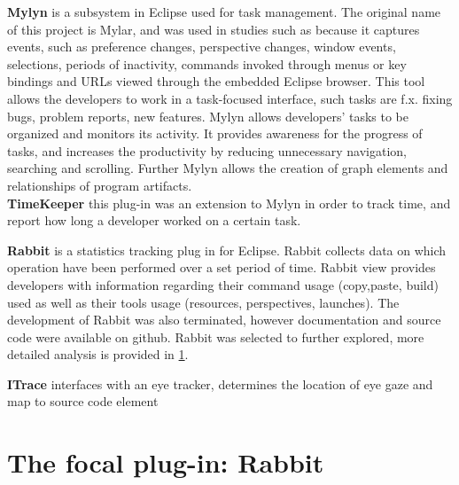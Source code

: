 \textbf{Mylyn} is a subsystem in Eclipse used for task management. The original name of this project is Mylar, and was used in studies such as 
because it captures events, such as preference changes, 
perspective changes, window events, selections, periods of inactivity, commands invoked through menus or key bindings and URLs viewed through the embedded Eclipse browser.
This tool allows the developers to work in a task-focused interface, such tasks are f.x. fixing bugs, problem reports, new features.
Mylyn allows developers' tasks to be organized and monitors its activity. It provides awareness for the progress of tasks, and increases the productivity by reducing unnecessary navigation, searching and scrolling.
Further Mylyn allows the creation of graph elements and relationships of program artifacts.\\
\textbf{TimeKeeper} this plug-in was an extension to Mylyn in order to track time, and report how long a developer worked on a certain task.

\textbf{Rabbit} is a statistics tracking plug in for Eclipse. Rabbit collects data on which operation have been performed over a set period of time.
Rabbit view provides developers with information regarding their command usage (copy,paste, build) 
used as well as their tools usage (resources, perspectives, launches). The development of Rabbit was also terminated, however documentation and source code were available on github.
Rabbit was selected to further explored, more detailed analysis is provided in \ref{sec:TheEclipseIDE:Rabbit}.

\textbf{ITrace} interfaces with an eye tracker, determines the location of eye
gaze and map to source code element

\section{The focal plug-in: Rabbit}
\label{sec:TheEclipseIDE:Rabbit}
